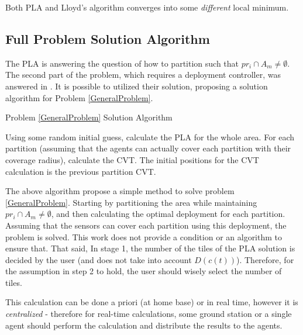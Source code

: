 \documentclass{iacas}
\begin{document}
Both PLA and Lloyd's algorithm converges into some \emph{different} local minimum.


\subsection{Full Problem Solution Algorithm}
The PLA is answering the question of how to partition such that $pr_i \cap A_m \neq \emptyset$. The second part of the problem, which requires a deployment controller, was answered in \cite{Cortes2004}. It is possible to utilized their solution, proposing a solution algorithm for Problem \ref{GeneralProblem}.

\begin{algorithm}[H]
\caption{Problem \ref{GeneralProblem} Solution Algorithm}\label{GeneralProbSolution}
\begin{algorithmic}[1]
\State Using some random initial guess, calculate the PLA for the whole area.
\State For each partition (assuming that the agents can actually cover each partition with their coverage radius), calculate the CVT. The initial positions for the CVT calculation is the previous partition CVT.
\end{algorithmic}
\label{algo:problem solution algorithm}
\end{algorithm}

The above algorithm propose a simple method to solve problem \ref{GeneralProblem}. Starting by partitioning the area while maintaining $pr_i \cap A_m \neq \emptyset$, and then calculating the optimal deployment for each partition. Assuming that the sensors can cover each partition using this deployment, the problem is solved. This work does not provide a condition or an algorithm to ensure that. That said, In stage 1, the number of the tiles of the PLA solution is decided by the user (and does not take into account $D(c(t))$). Therefore, for the assumption in step 2 to hold, the user should wisely select the number of tiles.

This calculation can be done a priori (at home base) or in real time, however it is \emph{centralized} - therefore for real-time calculations, some ground station or a single agent should perform the calculation and distribute the results to the agents.
\end{document}
